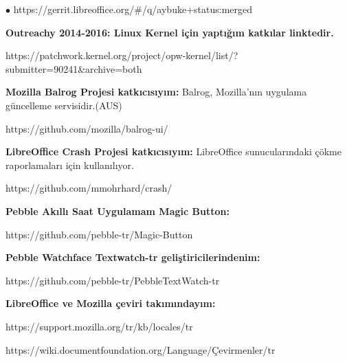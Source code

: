 \documentclass[margin,line]{res}
\newenvironment{list2}{
  \begin{list}{$\bullet$}{%
      \setlength{\itemsep}{0in}
      \setlength{\parsep}{0in} \setlength{\parskip}{0in}
      \setlength{\topsep}{0in} \setlength{\partopsep}{0in}
      \setlength{\leftmargin}{0.1in}}}{\end{list}}
\begin{document}
\begin{resume}
\begin{list2}
https://gerrit.libreoffice.org/\#/q/aybuke+status:merged
\item {\bf Outreachy 2014-2016: Linux Kernel i\c{c}in yapt{\i}\u{g}{\i}m katk{\i}lar linktedir.}

https://patchwork.kernel.org/project/opw-kernel/list/?submitter=90241\&archive=both
\item {\bf Mozilla Balrog Projesi katk{\i}c{\i}s{\i}y{\i}m:} Balrog, Mozilla'n{\i}n uygulama g\"{u}ncelleme servisidir.(AUS)

https://github.com/mozilla/balrog-ui/
\item {\bf LibreOffice Crash Projesi katk{\i}c{\i}s{\i}y{\i}m:}  LibreOffice sunucular{\i}ndaki \c{c}\"{o}kme raporlamalar{\i} i\c{c}in kullan{\i}l{\i}yor.

https://github.com/mmohrhard/crash/
\item {\bf Pebble Ak{\i}ll{\i} Saat Uygulamam Magic Button:}

https://github.com/pebble-tr/Magic-Button
\item {\bf Pebble Watchface Textwatch-tr geli\c{s}tiricilerindenim:}

https://github.com/pebble-tr/PebbleTextWatch-tr
\item {\bf LibreOffice ve Mozilla \c{c}eviri tak{\i}m{\i}nday{\i}m:}

https://support.mozilla.org/tr/kb/locales/tr

https://wiki.documentfoundation.org/Language/\c{C}evirmenler/tr
\end{list2}
\vspace{-.3cm}


\end{resume}
\end{document}

